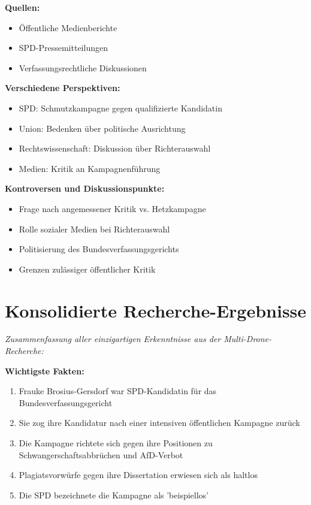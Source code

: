 \documentclass[12pt,a4paper]{article}
\begin{document}
\textbf{Quellen:}
\begin{itemize}
\item Öffentliche Medienberichte
\item SPD-Pressemitteilungen
\item Verfassungsrechtliche Diskussionen
\end{itemize}

\textbf{Verschiedene Perspektiven:}
\begin{itemize}
\item SPD: Schmutzkampagne gegen qualifizierte Kandidatin
\item Union: Bedenken über politische Ausrichtung
\item Rechtswissenschaft: Diskussion über Richterauswahl
\item Medien: Kritik an Kampagnenführung
\end{itemize}

\textbf{Kontroversen und Diskussionspunkte:}
\begin{itemize}
\item Frage nach angemessener Kritik vs. Hetzkampagne
\item Rolle sozialer Medien bei Richterauswahl
\item Politisierung des Bundesverfassungsgerichts
\item Grenzen zulässiger öffentlicher Kritik
\end{itemize}

\newpage
\section{Konsolidierte Recherche-Ergebnisse}

\textit{Zusammenfassung aller einzigartigen Erkenntnisse aus der Multi-Drone-Recherche:}

\textbf{Wichtigste Fakten:}
\begin{enumerate}
\item Frauke Brosius-Gersdorf war SPD-Kandidatin für das Bundesverfassungsgericht
\item Sie zog ihre Kandidatur nach einer intensiven öffentlichen Kampagne zurück
\item Die Kampagne richtete sich gegen ihre Positionen zu Schwangerschaftsabbrüchen und AfD-Verbot
\item Plagiatsvorwürfe gegen ihre Dissertation erwiesen sich als haltlos
\item Die SPD bezeichnete die Kampagne als 'beispiellos'
\end{enumerate}
\end{document}
